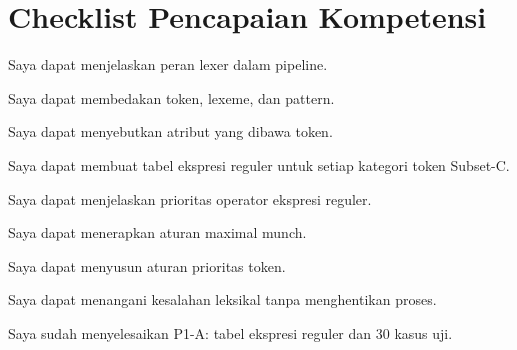 \section*{Checklist Pencapaian Kompetensi}

\begin{checklist}
  \item Saya dapat menjelaskan peran lexer dalam pipeline.
  \item Saya dapat membedakan token, lexeme, dan pattern.
  \item Saya dapat menyebutkan atribut yang dibawa token.
  \item Saya dapat membuat tabel ekspresi reguler untuk setiap
        kategori token Subset-C.
  \item Saya dapat menjelaskan prioritas operator ekspresi reguler.
  \item Saya dapat menerapkan aturan maximal munch.
  \item Saya dapat menyusun aturan prioritas token.
  \item Saya dapat menangani kesalahan leksikal tanpa menghentikan
        proses.
  \item Saya sudah menyelesaikan P1-A: tabel ekspresi reguler dan 30
        kasus uji.
\end{checklist}
